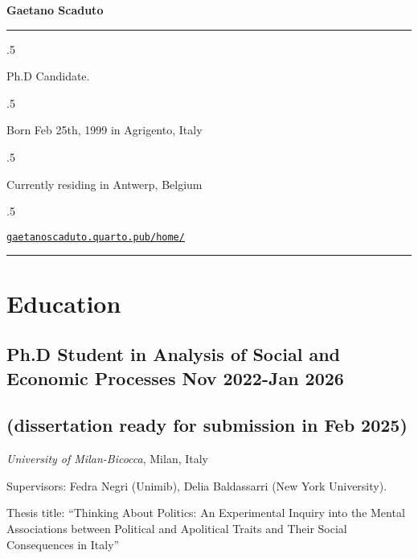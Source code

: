 \documentclass[10pt,]{article}
\providecommand{\tightlist}{%
  \setlength{\itemsep}{0pt}\setlength{\parskip}{0pt}}
\renewenvironment{itemize}{
  \begin{list}{}{
    \setlength{\leftmargin}{1.5em}
  }
}{
  \end{list}
}
\begin{document}
\centerline{\huge \bf Gaetano Scaduto}

\vspace{2 mm}

\hrule

\vspace{2 mm}

\moveleft.5\hoffset\centerline{Ph.D Candidate.}
\moveleft.5\hoffset\centerline{Born Feb 25th, 1999 in Agrigento, Italy}
\moveleft.5\hoffset\centerline{Currently residing in Antwerp, Belgium}
\moveleft.5\hoffset\centerline{       \faGlobe \hspace{1 mm} \href{http://gaetanoscaduto.quarto.pub/home/}{\tt gaetanoscaduto.quarto.pub/home/}   } 

\vspace{2 mm}

\hrule


\section{\texorpdfstring{\textbf{Education}}{Education}}\label{education}

\subsection{\texorpdfstring{Ph.D Student in Analysis of Social and
Economic Processes \hfill Nov 2022-Jan
2026}{Ph.D Student in Analysis of Social and Economic Processes Nov 2022-Jan 2026}}\label{ph.d-student-in-analysis-of-social-and-economic-processes-nov-2022-jan-2026}

\subsection{\texorpdfstring{\hfill (dissertation ready for submission in
Feb
2025)}{(dissertation ready for submission in Feb 2025)}}\label{dissertation-ready-for-submission-in-feb-2025}

\begin{itemize}
\tightlist
\item
  \emph{University of Milan-Bicocca}, Milan, Italy
\item
  Supervisors: Fedra Negri (Unimib), Delia Baldassarri (New York
  University).
\item
  Thesis title: ``Thinking About Politics: An Experimental Inquiry into
  the Mental Associations between Political and Apolitical Traits and
  Their Social Consequences in Italy''
\end{itemize}
\end{document}
